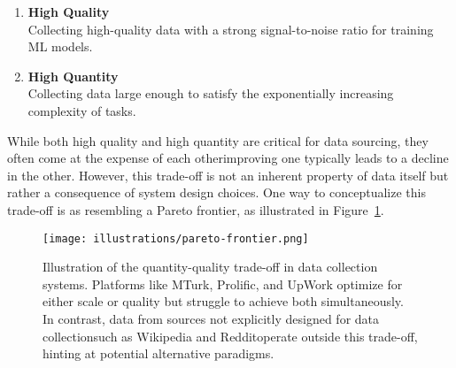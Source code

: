 \begin{tcolorbox}[
    colback=gray!15,   %
    colframe=gray!15,  %
    coltitle=black,    %
    sharp corners,     %
    width=\linewidth,  %
    boxrule=0pt,       %
    left=10pt, right=10pt, top=7pt, bottom=8pt, %
    before=\bigskip, %
    after=\bigskip,  %
    title={\fontsize{12}{15} \textbf{Human Data Sourcing Desiderata}}, %
    fonttitle=\bfseries, %
    before title={\vspace{10pt}}, %
    titlerule=0mm, %
]
\begin{enumerate}[leftmargin=14pt, label=(\arabic*), itemsep=10pt] %
    \item \textbf{High Quality} \\[3pt]
    Collecting high-quality data with a strong signal-to-noise ratio for training ML models.

    \item \textbf{High Quantity} \\[3pt]
    Collecting data large enough to satisfy the exponentially increasing complexity of tasks.
\end{enumerate}
\end{tcolorbox}


While both high quality and high quantity are critical for data sourcing, they often come at the expense of each other\textemdash{}improving one typically leads to a decline in the other. However, this trade-off is not an inherent property of data itself but rather a consequence of system design choices. One way to conceptualize this trade-off is as resembling a Pareto frontier, as illustrated in Figure~\ref{fig:quality-quantity}.

\begin{figure}[h]
    \centering
    \texttt{[image: illustrations/pareto-frontier.png]}
    \caption{Illustration of the quantity-quality trade-off in data collection systems. Platforms like MTurk, Prolific, and UpWork optimize for either scale or quality but struggle to achieve both simultaneously. In contrast, data from sources not explicitly designed for data collection\textemdash{}such as Wikipedia and Reddit\textemdash{}operate outside this trade-off, hinting at potential alternative paradigms.}
    \label{fig:quality-quantity}
\end{figure}

